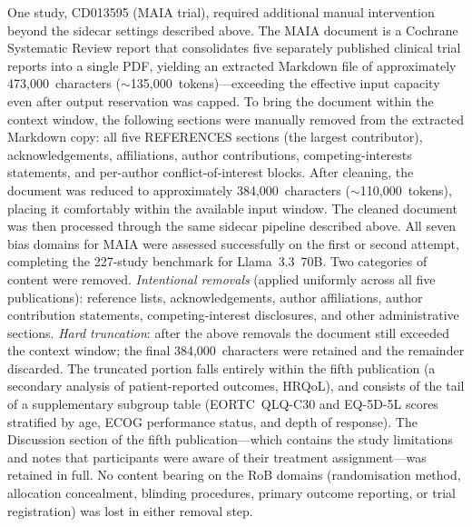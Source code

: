 \documentclass[../main.tex]{subfiles}
\begin{document}
One study, CD013595 (MAIA trial), required additional manual intervention beyond
the sidecar settings described above.
The MAIA document is a Cochrane Systematic Review report that consolidates five
separately published clinical trial reports into a single PDF, yielding an extracted
Markdown file of approximately 473,000~characters ($\sim$135,000~tokens)---exceeding
the effective input capacity even after output reservation was capped.
To bring the document within the context window, the following sections were manually
removed from the extracted Markdown copy: all five REFERENCES sections (the largest
contributor), acknowledgements, affiliations, author contributions,
competing-interests statements, and per-author conflict-of-interest blocks.
After cleaning, the document was reduced to approximately 384,000~characters
($\sim$110,000~tokens), placing it comfortably within the available input window.
The cleaned document was then processed through the same sidecar pipeline described
above.
All seven bias domains for MAIA were assessed successfully on the first or second
attempt, completing the 227-study benchmark for Llama~3.3~70B.
Two categories of content were removed.
\emph{Intentional removals} (applied uniformly across all five publications):
reference lists, acknowledgements, author affiliations, author contribution
statements, competing-interest disclosures, and other administrative sections.
\emph{Hard truncation}: after the above removals the document still exceeded the
context window; the final 384,000~characters were retained and the remainder
discarded.
The truncated portion falls entirely within the fifth publication (a secondary
analysis of patient-reported outcomes, HRQoL), and consists of the tail of a
supplementary subgroup table (EORTC~QLQ-C30 and EQ-5D-5L scores stratified by
age, ECOG performance status, and depth of response).
The Discussion section of the fifth publication---which contains the study
limitations and notes that participants were aware of their treatment
assignment---was retained in full.
No content bearing on the RoB domains (randomisation method, allocation
concealment, blinding procedures, primary outcome reporting, or trial
registration) was lost in either removal step.
\end{document}
